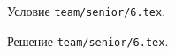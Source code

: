 \problem{}
Условие \texttt{team/senior/6.tex}.

\solution Решение \texttt{team/senior/6.tex}.
\endproblem
